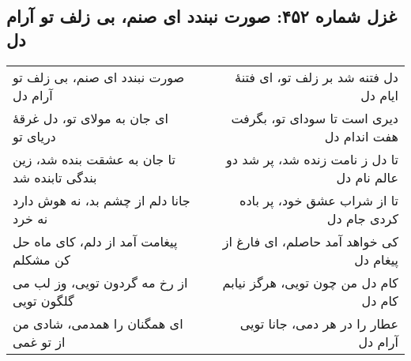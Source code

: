 \begin{center}
\section*{غزل شماره ۴۵۲: صورت نبندد ای صنم، بی زلف تو آرام دل}
\label{sec:452}
\begin{longtable}{l p{0.5cm} r}
صورت نبندد ای صنم، بی زلف تو آرام دل
&&
دل فتنه شد بر زلف تو، ای فتنهٔ ایام دل
\\
ای جان به مولای تو، دل غرقهٔ دریای تو
&&
دیری است تا سودای تو، بگرفت هفت اندام دل
\\
تا جان به عشقت بنده شد، زین بندگی تابنده شد
&&
تا دل ز نامت زنده شد، پر شد دو عالم نام دل
\\
جانا دلم از چشم بد، نه هوش دارد نه خرد
&&
تا از شراب عشق خود، پر باده کردی جام دل
\\
پیغامت آمد از دلم، کای ماه حل کن مشکلم
&&
کی خواهد آمد حاصلم، ای فارغ از پیغام دل
\\
از رخ مه گردون تویی، وز لب می گلگون تویی
&&
کام دل من چون تویی، هرگز نیابم کام دل
\\
ای همگنان را همدمی، شادی من از تو غمی
&&
عطار را در هر دمی، جانا تویی آرام دل
\\
\end{longtable}
\end{center}
